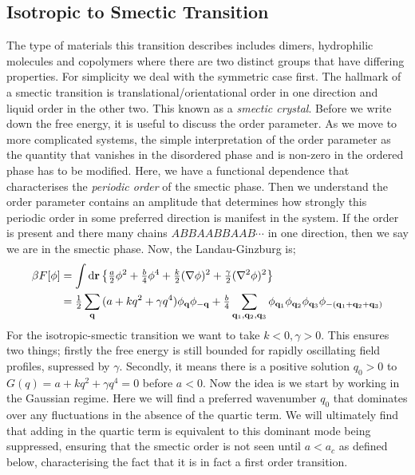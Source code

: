 \subsection{Isotropic to Smectic Transition}
The type of materials this transition describes includes dimers, hydrophilic molecules and copolymers where there are two distinct groups that have differing properties. For simplicity we deal with the symmetric case first. The hallmark of a smectic transition is translational/orientational order in one direction and liquid order in the other two. This known as a \emph{smectic crystal}. Before we write down the free energy, it is useful to discuss the order parameter. As we move to more complicated systems, the simple interpretation of the order parameter as the quantity that vanishes in the disordered phase and is non-zero in the ordered phase has to be modified. Here, we have a functional dependence that characterises the \emph{periodic order} of the smectic phase. Then we understand the order parameter contains an amplitude that determines how strongly this periodic order in some preferred direction is manifest in the system. If the order is present and there many chains $ABBAABBAAB\cdots$ in one direction, then we say we are in the smectic phase. Now, the Landau-Ginzburg is;
\begin{align*}
\beta F[\phi] &= \int{\upd{\vec{r}}\set{\tfrac{a}{2}\phi^2 + \tfrac{b}{4}\phi^4 + \tfrac{k}{2}(\nabla\phi)^2 + \tfrac{\gamma}{2}(\nabla^2\phi)^2}} \\
&= \tfrac{1}{2}\sum_{\vec{q}}{(a + kq^2 + \gamma q^4)\phi_{\vec{q}}\phi_{-\vec{q}}} + \tfrac{b}{4}\sum_{\vec{q}_1, \vec{q}_2, \vec{q}_3}{\phi_{\vec{q}_1}\phi_{\vec{q}_2}\phi_{\vec{q}_3}\phi_{-(\vec{q}_1 + \vec{q}_2 + \vec{q}_3)}}
\end{align*}
For the isotropic-smectic transition we want to take $k < 0, \gamma > 0$. This ensures two things; firstly the free energy is still bounded for rapidly oscillating field profiles, supressed by $\gamma$. Secondly, it means there is a positive solution $q_0 > 0$ to $G(q) = a + kq^2 + \gamma q^4 = 0$ before $a < 0$. Now the idea is we start by working in the Gaussian regime. Here we will find a preferred wavenumber $q_0$ that dominates over any fluctuations in the absence of the quartic term. We will ultimately find that adding in the quartic term is equivalent to this dominant mode being suppressed, ensuring that the smectic order is not seen until $a < a_c$ as defined below, characterising the fact that it is in fact a first order transition.
